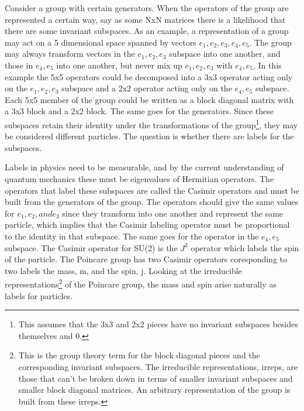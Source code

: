 Consider a group with certain generators. When the operators of the group are represented a certain way, say as some NxN matrices there is a likelihood that there are some invariant subspaces. As an example, a representation of a group may act on a 5 dimensional space spanned by vectors $e_1, e_2, e_3, e_4, e_5$. The group may always transform vectors in the $e_1, e_2, e_3$ subspace into one another, and those in $e_4, e_5$ into one another, but never mix up $e_1, e_2, e_3$ with $e_4, e_5$. In this example the 5x5 operators could be decomposed into a 3x3 operator acting only on the $e_1, e_2, e_3$ subspace and a 2x2 operator acting only on the $e_4, e_5$ subspace. Each 5x5 member of the group could be written as a block diagonal matrix with a 3x3 block and a 2x2 block. The same goes for the generators. Since these subspaces retain their identity under the transformations of the group\footnote{This assumes that the 3x3 and 2x2 pieces have no invariant subspaces besides themselves and 0.}, they may be considered different particles. The question is whether there are labels for the subspaces.  

Labels in physics need to be measurable, and by the current understanding of quantum mechanics these must be eigenvalues of Hermitian operators. The operators that label these subspaces are called the Casimir operators and must be built from the generators of the group. The operators should give the same values for $e_1, e_2, and e_3$ since they transform into one another and represent the same particle, which implies that the Casimir labeling operator must be proportional to the identity in that subspace. The same goes for the operator in the $e_4, e_5$ subspace. The Casimir operator for SU(2) is the $J^2$ operator which labels the spin of the particle. The Poincare group has two Casimir operators coresponding to two labels the mass, m, and the spin, j. Looking at the irreducible representations\footnote{This is the group theory term for the block diagonal pieces and the corresponding invariant subspaces. The irreducible representations, irreps, are those that can't be broken down in terms of smaller invariant subspaces and smaller block diagonal matrices. An arbitrary representation of the group is built from these irreps.} of the Poincare group, the mass and spin arise naturally as labels for particles. 


